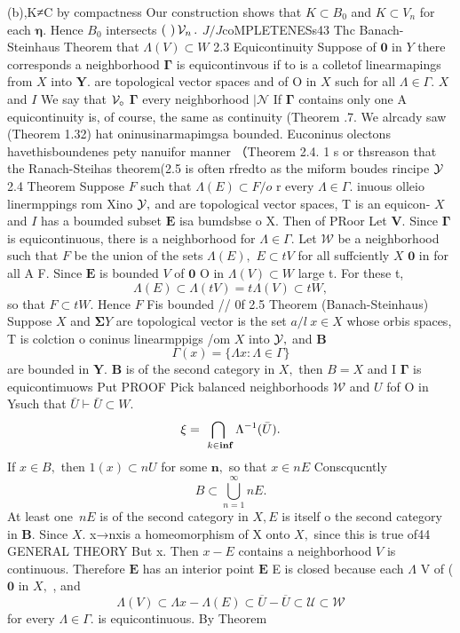 (b),K≠C by compactness Our construction shows that $K\subset B_{0}$ and $K\subset V_{n}$ for each ${\boldsymbol{\eta}}.$ Hence $B_{0}$ intersects $\left(\ \right){\cal V}_{n}\,.$ $J/J$coMPLETENESs43 Thc Banach-Steinhaus Theorem that $\Lambda(V)\subset W$ 2.3 Equicontinuity Suppose of $\mathbf{0}$ in ${\mathbf{}}Y$ there corresponds a neighborhood $\boldsymbol{\Gamma}$ is equicontinvous if to is a colletof linearmapings from $\textstyle X$ into ${\boldsymbol{Y}}.$ are topological vector spaces and of O in $\textstyle X$ such for all $\Lambda\in\Gamma.$ $\textstyle X$ and $\boldsymbol{\mathit{I}}$ We say that ${\cal V}_{\circ}$ ${\boldsymbol{\Gamma}}$ every neighborhood $\textstyle|\mathcal{N}$ If ${\boldsymbol{\Gamma}}$ contains only one A equicontinuity is, of course, the same as continuity (Theorem .7. We alrcady saw (Theorem 1.32) hat oninusinarmapimgsa bounded. Euconinus olectons havethisboundenes pety nanuifor manner （Theorem 2.4. 1 s or thsreason that the Ranach-Steihas theorem(2.5 is often rfredto as the miform boudes rincipe ${\cal{Y}}$ 2.4 Theorem Suppose ${\mathbf{}}F$ such that $\Lambda(E)\subset F/o$ r every $\Lambda\in\Gamma.$ inuous olleio linermppings rom Xino ${\cal{Y}},$ and are topological vector spaces, T is an equicon- $\textstyle X$ and $\boldsymbol{\mathit{I}}$ has a boumded subset $\boldsymbol{E}$ isa bumdsbse o X. Then of PRoor Let ${\boldsymbol{V}}.$ Since ${\boldsymbol{\Gamma}}$ is equicontinuous, there is a neighborhood for $\Lambda\in\Gamma.$ Let ${\mathcal W}$ be a neighborhood such that ${\mathbf{}}F$ be the union of the sets $\Lambda(E),$ $E\subset t V$ for all suffciently $X$ ${\boldsymbol{0}}$ in for all A F. Since ${\boldsymbol{E}}$ is bounded ${\mathbf{}}V$ of $\mathbf{0}$ O in $\Lambda(V)\subset W$ large t. For these t, $$ \Lambda(E)\subset\Lambda(t V)=t\Lambda(V)\subset t W, $$ so that $F\subset t W.$ Hence ${\mathbf{}}F$ Fis bounded // 0f 2.5 Theorem (Banach-Steinhaus) Suppose $\textstyle X$ and $\mathbf{\Sigma}Y$ are topological vector is the set $a/l\ x\in X$ whose orbis spaces, T is colction o coninus linearmppigs /om $\textstyle X$ into ${\cal{Y}},$ and $\boldsymbol{B}$ $$ \Gamma(x)=\{\Lambda x:\Lambda\in\Gamma\} $$ are bounded in ${\boldsymbol{Y}}.$ $\boldsymbol{B}$ is of the second category in $X,$ then $B=X$ and I ${\boldsymbol{\Gamma}}$ is equicontimuows Put PROOF Pick balanced neighborhoods ${\mathcal{W}}$ and $U$ fof O in Ysuch that $\bar{U}\vdash\bar{U}\subset W.$ $$ \xi=\bigcap_{\ k\in\bf{i n f}}\Lambda^{-1}(\bar{U}). $$ If $x\in B,$ then $1\left(x\right)\subset n U$ for some ${\boldsymbol{n}},$ so that $x\in n E$ Conscqucntly $$ B\subset\bigcup_{n=1}^{\infty}n E. $$ At least one $\,n E$ is of the second category in $\scriptstyle{X,E}$ is itself o the second category in ${\boldsymbol{B}}.$ Since $X.$ x→nxis a homeomorphism of X onto $X,$ since this is true of44 GENERAL THEORY But x. Then $x-E$ contains a neighborhood ${\mathbf{}}V$ is continuous. Therefore ${\boldsymbol{E}}$ has an interior point $\boldsymbol{E}$ E is closed because each $\Lambda$ V of ( $\mathbf{0}$ in $X,$ , and $$ \Lambda(V)\subset\Lambda x-\Lambda(E)\subset\overline{{{U}}}-\overline{{{U}}}\subset\mathcal{U}\subset\mathcal{W} $$ for every $\Lambda\in\Gamma.$ is equicontinuous. By Theorem 